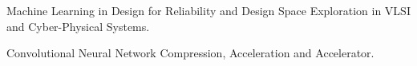 
\begin{cvitems}

\footnotesize{

\item Machine Learning in Design for Reliability and Design Space Exploration in VLSI and Cyber-Physical Systems.
\item Convolutional Neural Network Compression, Acceleration and Accelerator.
}

\end{cvitems}

